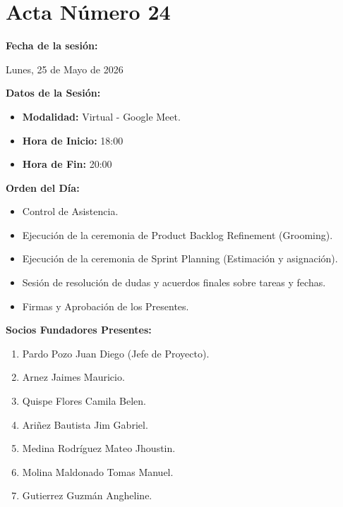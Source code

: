 \newpage
\section{Acta Número 24}
\label{sec:acta24}

\noindent \textbf{Fecha de la sesión:}\par
Lunes, 25 de Mayo de 2026

\vspace*{0.5cm}
\noindent \textbf{Datos de la Sesión:}
\vspace{-0.2cm}
\begin{itemize}[noitemsep]
\item \textbf{Modalidad:} Virtual - Google Meet.
\item \textbf{Hora de Inicio:} 18:00
\item \textbf{Hora de Fin:} 20:00
\end{itemize}

\vspace*{0.5cm}
\noindent \textbf{Orden del Día:}
\vspace{-0.2cm}
\begin{itemize}[noitemsep]
\item Control de Asistencia.
\item Ejecución de la ceremonia de Product Backlog Refinement (Grooming).
\item Ejecución de la ceremonia de Sprint Planning (Estimación y asignación).
\item Sesión de resolución de dudas y acuerdos finales sobre tareas y fechas.
\item Firmas y Aprobación de los Presentes.
\end{itemize}

\vspace*{0.5cm}
\noindent \textbf{Socios Fundadores Presentes:}
\vspace{-0.2cm}
\begin{enumerate}[noitemsep]
\item Pardo Pozo Juan Diego (Jefe de Proyecto).
\item Arnez Jaimes Mauricio.
\item Quispe Flores Camila Belen.
\item Ariñez Bautista Jim Gabriel.
\item Medina Rodríguez Mateo Jhoustin.
\item Molina Maldonado Tomas Manuel.
\item Gutierrez Guzmán Angheline.
\end{enumerate}

